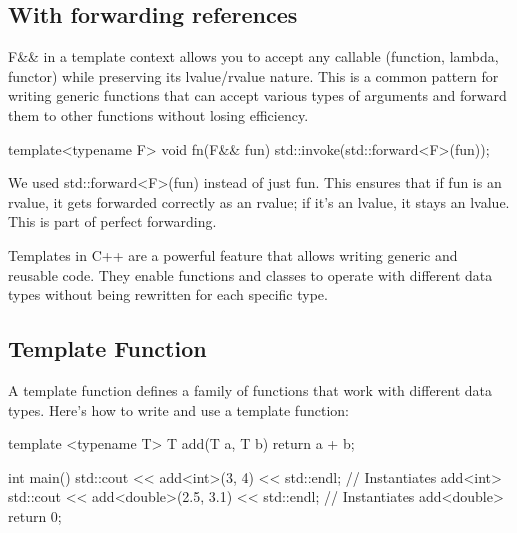 \documentclass{report}
\begin{document}
    \subsection{With forwarding references}
    \bigbreak \noindent 
    F\&\& in a template context allows you to accept any callable (function, lambda, functor) while preserving its lvalue/rvalue nature. This is a common pattern for writing generic functions that can accept various types of arguments and forward them to other functions without losing efficiency.
    \bigbreak \noindent 
    \begin{cppcode}
    template<typename F>
    void fn(F&& fun) {
        std::invoke(std::forward<F>(fun));
    }
    \end{cppcode}
    \bigbreak \noindent 
    We used std::forward<F>(fun) instead of just fun. This ensures that if fun is an rvalue, it gets forwarded correctly as an rvalue; if it's an lvalue, it stays an lvalue. This is part of perfect forwarding.
    






    \pagebreak 
    \bigbreak \noindent 
    Templates in C++ are a powerful feature that allows writing generic and reusable code. They enable functions and classes to operate with different data types without being rewritten for each specific type.
    \bigbreak \noindent 
    \subsection{Template Function}
    \bigbreak \noindent 
    A template function defines a family of functions that work with different data types. Here's how to write and use a template function:
    \bigbreak \noindent 
    \begin{cppcode}
template <typename T>
T add(T a, T b) {
    return a + b;
}

int main() {
    std::cout << add<int>(3, 4) << std::endl; // Instantiates add<int>
    std::cout << add<double>(2.5, 3.1) << std::endl; // Instantiates add<double>
    return 0;
}
    \end{cppcode}

    \bigbreak \noindent 
    \pagebreak 
\end{document}
